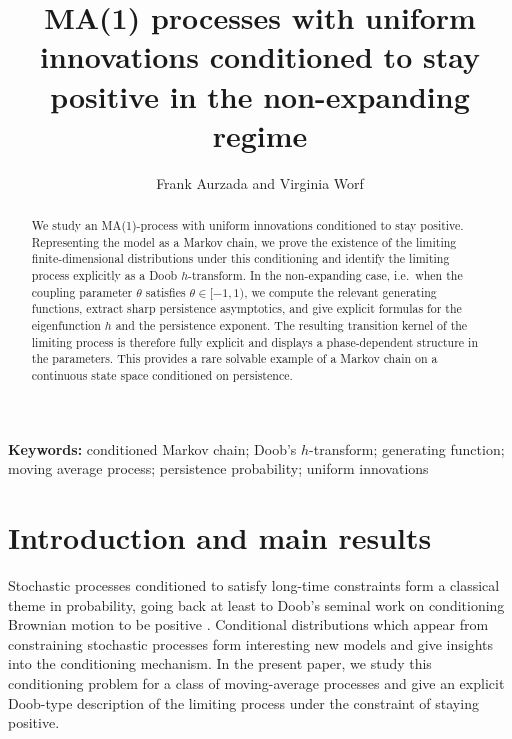 \documentclass[12pt]{article}
\title{MA(1) processes with uniform innovations conditioned to stay positive in the non-expanding regime}
\author{Frank Aurzada and  Virginia Worf}
\newcommand{\1}{\mathds{1}}
\theoremstyle{definition}
\theoremstyle{plain}
\theoremstyle{remark}
\begin{document}
\maketitle 
\allowdisplaybreaks

\begin{abstract}
We study an MA(1)-process with uniform innovations conditioned to stay positive. Representing the model as a Markov chain, we prove the existence of the limiting finite-dimensional distributions under this conditioning and identify the limiting process explicitly as a Doob $h$-transform. In the non-expanding case, i.e.\ when the coupling parameter $\theta$ satisfies $\theta\in[-1,1)$, we compute the relevant generating functions, extract sharp persistence asymptotics, and give explicit formulas for the eigenfunction $h$ and the persistence exponent. The resulting transition kernel of the limiting process is therefore fully explicit and displays a phase-dependent structure in the parameters. This provides a rare solvable example of a Markov chain on a continuous state space conditioned on persistence.
\end{abstract}

{\bf Keywords:} conditioned Markov chain; Doob's $h$-transform; generating function; moving average process; persistence probability; uniform innovations

\section{Introduction and main results}
Stochastic processes conditioned to satisfy long-time constraints form a classical theme in probability, going back at least to Doob's seminal work on conditioning Brownian motion to be positive \cite{doob}. Conditional distributions which appear from constraining stochastic processes form interesting new models and give insights into the conditioning mechanism. In the present paper, we study this conditioning problem for a class of moving-average processes and give an explicit Doob-type description of the limiting process under the constraint of staying positive.
\end{document}
